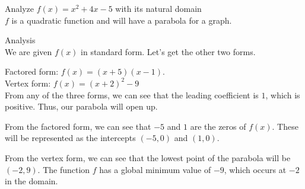 \documentclass{ximera}
\begin{document}
\begin{example}   Analyze $f(x) = x^2 + 4x - 5$ with its natural domain    \\ 


$f$ is a quadratic function and will have a parabola for a graph.

\begin{explanation} Analysis \\


We are given $f(x)$ in standard form.  Let's get the other two forms.

Factored form: $f(x) = (x+5)(x-1)$. \\

Vertex form: $f(x) = (x+2)^2 - 9$ \\


From any of the three forms, we can see that the leading coefficient is $1$, which is positive.  Thus, our parabola will open up.


From the factored form, we can see that $-5$ and $1$ are the zeros of $f(x)$.  These will be represented as the intercepts $(-5, 0)$ and $(1,0)$.


From the vertex form, we can see that the lowest point of the parabola will be $(-2, 9)$.  The function $f$ has a global minimum value of $-9$, which occurs at $-2$ in the domain.




\begin{image}
\end{image}
\end{explanation}
\end{example}
\end{document}
